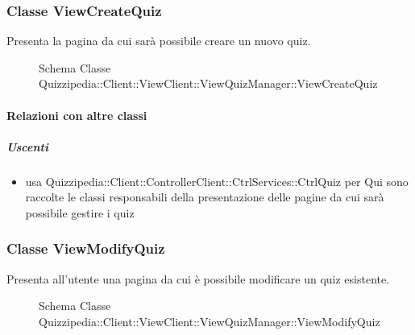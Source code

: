 \subsubsection{Classe ViewCreateQuiz}
Presenta la pagina da cui sarà possibile creare un nuovo quiz.
\begin{figure}[H]
\centering
\noindent{}
\caption[Schema Classe ViewCreateQuiz]{Schema Classe Quizzipedia::Client::ViewClient::ViewQuizManager::ViewCreateQuiz}
\end{figure}
\paragraph{Relazioni con altre classi}
\subparagraph{Uscenti}
\begin{itemize}
\item usa Quizzipedia::Client::ControllerClient::CtrlServices::CtrlQuiz per Qui sono raccolte le classi responsabili della presentazione delle pagine da cui sarà possibile gestire i quiz
\end{itemize}
\subsubsection{Classe ViewModifyQuiz}
Presenta all'utente una pagina da cui è possibile modificare un quiz esistente.
\begin{figure}[H]
\centering
\noindent{}
\caption[Schema Classe ViewModifyQuiz]{Schema Classe Quizzipedia::Client::ViewClient::ViewQuizManager::ViewModifyQuiz}
\end{figure}
